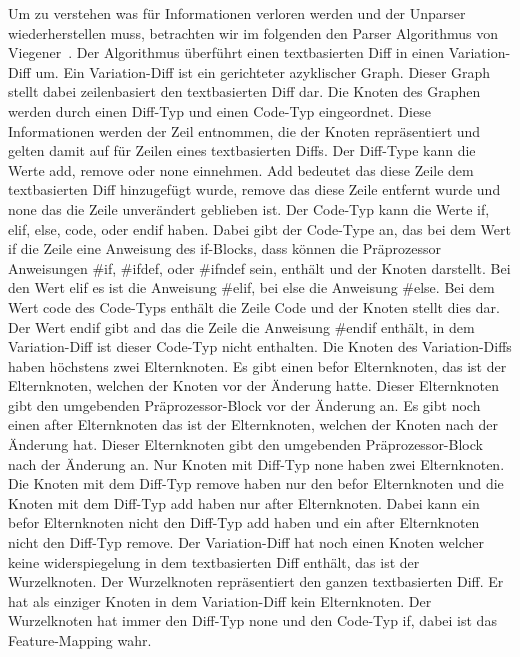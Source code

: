 Um zu verstehen was für Informationen verloren werden und der Unparser wiederherstellen muss, betrachten wir im folgenden den Parser Algorithmus von Viegener~\cite{Viegener21}. Der Algorithmus überführt einen textbasierten Diff in einen Variation-Diff um. Ein Variation-Diff ist ein gerichteter azyklischer Graph. Dieser Graph stellt dabei zeilenbasiert den textbasierten Diff dar. Die Knoten des Graphen werden durch einen Diff-Typ und einen Code-Typ eingeordnet. Diese Informationen werden der Zeil entnommen, die der Knoten repräsentiert und gelten damit auf für Zeilen eines textbasierten Diffs. Der Diff-Type kann die Werte add, remove oder none einnehmen. Add bedeutet das diese Zeile dem textbasierten Diff hinzugefügt wurde, remove das diese Zeile entfernt wurde und none das die Zeile unverändert geblieben ist. Der Code-Typ kann die Werte if, elif, else, code, oder endif haben. Dabei gibt der Code-Type an, das bei dem Wert if die Zeile eine Anweisung des if-Blocks, dass können die Präprozessor Anweisungen \#if, \#ifdef, oder \#ifndef sein, enthält und der Knoten darstellt. Bei den Wert elif es ist die Anweisung \#elif, bei else die Anweisung \#else. Bei dem Wert code des Code-Typs enthält die Zeile Code und der Knoten stellt dies dar. Der Wert endif gibt and das die Zeile die Anweisung \#endif enthält, in dem Variation-Diff ist dieser Code-Typ nicht enthalten. Die Knoten des Variation-Diffs haben höchstens zwei Elternknoten. Es gibt einen befor Elternknoten, das ist der Elternknoten, welchen der Knoten vor der Änderung hatte. Dieser Elternknoten gibt den umgebenden Präprozessor-Block vor der Änderung an. Es gibt noch einen after Elternknoten das ist der Elternknoten, welchen der Knoten nach der Änderung hat. Dieser Elternknoten gibt den umgebenden Präprozessor-Block nach der Änderung an. Nur Knoten mit Diff-Typ none haben zwei Elternknoten. Die Knoten mit dem Diff-Typ remove haben nur den befor Elternknoten und die Knoten mit dem Diff-Typ add haben nur after Elternknoten. Dabei kann ein befor Elternknoten nicht den Diff-Typ add haben und ein after Elternknoten nicht den Diff-Typ remove. Der Variation-Diff hat noch einen Knoten welcher keine widerspiegelung in dem textbasierten Diff enthält, das ist der Wurzelknoten. Der Wurzelknoten repräsentiert den ganzen textbasierten Diff. Er hat als einziger Knoten in dem Variation-Diff kein Elternknoten. Der Wurzelknoten hat immer den Diff-Typ none und den Code-Typ if, dabei ist das Feature-Mapping wahr.



